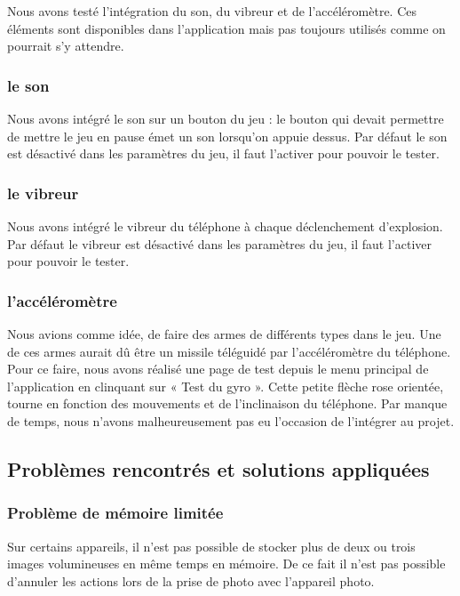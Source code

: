 \documentclass{report}
\begin{document}
Nous avons testé l’intégration du son, du vibreur et de l’accéléromètre.
Ces éléments sont disponibles dans l’application mais pas toujours
utilisés comme on pourrait s’y attendre.

\subsubsection{le son}

Nous avons intégré le son sur un bouton du jeu : le bouton qui devait
permettre de mettre le jeu en pause émet un son lorsqu’on appuie dessus.
Par défaut le son est désactivé dans les paramètres du jeu, il faut
l’activer pour pouvoir le tester.

\subsubsection{le vibreur}

Nous avons intégré le vibreur du téléphone à chaque déclenchement
d’explosion. Par défaut le vibreur est désactivé dans les paramètres du
jeu, il faut l’activer pour pouvoir le tester.

\subsubsection{l’accéléromètre}

Nous avions comme idée, de faire des armes de différents types dans le
jeu. Une de ces armes aurait dû être un missile téléguidé par
l’accéléromètre du téléphone. Pour ce faire, nous avons réalisé une page
de test depuis le menu principal de l’application en clinquant sur
« Test du gyro ». Cette petite flèche rose orientée, tourne en fonction
des mouvements et de l’inclinaison du téléphone. Par manque de temps, nous
n’avons malheureusement pas eu l’occasion de l’intégrer au projet.

\subsection{Problèmes rencontrés et solutions appliquées}
\bigskip


\subsubsection{Problème de mémoire limitée}

Sur certains appareils, il n’est pas possible de stocker plus de deux ou
trois images volumineuses en même temps en mémoire. De ce fait il n’est
pas possible d’annuler les actions lors de la prise de photo avec
l’appareil photo.
\end{document}

